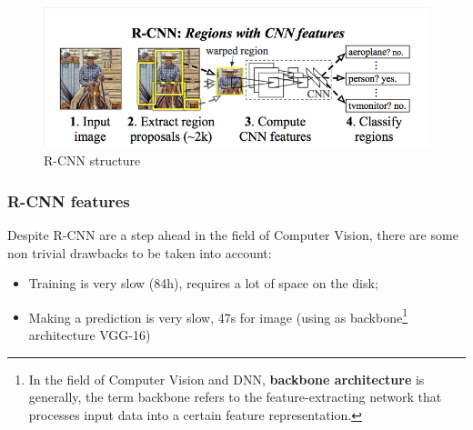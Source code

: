 \begin{figure}
    \centering
    \includegraphics[scale=0.7]{img/R-CNN_1.png}
    \caption{R-CNN structure} 
\end{figure}

\subsubsection{R-CNN features}
Despite R-CNN are a step ahead in the field of Computer Vision, there are some non trivial drawbacks to be taken into account: 
\begin{itemize}
    \itemsep-0.3em
    \item Training is very slow (84h), requires a lot of space on the disk;
    \item Making a prediction is very slow, 47s for image (using as backbone\footnote{
        In the field of Computer Vision and DNN, \textbf{backbone architecture} is generally, the term backbone refers to the feature-extracting network that processes input data into a certain feature representation.
    } architecture VGG-16)
\end{itemize}

